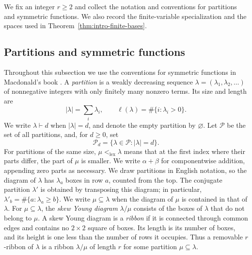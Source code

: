 \documentclass[12pt,reqno,a4paper]{amsart}
\numberwithin{equation}{section}
\numberwithin{figure}{section}
\theoremstyle{plain}
\theoremstyle{definition}
\begin{document}
We fix an integer $r\geq2$ and collect the notation and
conventions for partitions and symmetric functions.
We also record the finite-variable specialization and the spaces used
in Theorem~\ref{thm:intro-finite-bases}.

\subsection{Partitions and symmetric functions}
\label{subsec:ordinary-symmetric-functions}

Throughout this subsection we use the conventions for symmetric
functions in Macdonald's book \cite[Chapter~I]{Macdonald}.
A \emph{partition} is a weakly decreasing sequence
$\lambda=(\lambda_1,\lambda_2,\ldots)$ of nonnegative integers with
only finitely many nonzero terms.  Its size and length are
\[
 |\lambda|=\sum_i\lambda_i,
 \qquad
 \ell(\lambda)=\#\{i:\lambda_i>0\}.
\]
We write $\lambda\vdash d$ when $|\lambda|=d$, and denote the empty
partition by $\varnothing$.
Let $\mathscr P$ be the set of all partitions, and, for $d\geq0$, set
\[
 \mathscr P_d=\{\lambda\in\mathscr P:|\lambda|=d\}.
\]
For partitions of the same size, $\mu<_{\mathrm{lex}}\lambda$ means
that at the first index where their parts differ, the part of $\mu$
is smaller.  We write $\alpha+\beta$ for componentwise addition,
appending zero parts as necessary.
We draw partitions in English notation, so the diagram of $\lambda$
has $\lambda_a$ boxes in row $a$, counted from the top.  The conjugate
partition $\lambda'$ is obtained by transposing this diagram; in
particular, $\lambda'_b=\#\{a:\lambda_a\geq b\}$.  We write
$\mu\subseteq\lambda$ when the diagram of $\mu$ is contained in that
of $\lambda$.  For $\mu\subseteq\lambda$, the \emph{skew Young diagram}
$\lambda/\mu$ consists of the boxes of $\lambda$ that do not belong to
$\mu$.  A skew Young diagram is a \emph{ribbon} if it is connected
through common edges and contains no $2\times2$ square of boxes.  Its
length is its number of boxes, and its height is one less than the number
of rows it occupies.  Thus a removable $r$-ribbon of $\lambda$ is a
ribbon $\lambda/\mu$ of length $r$ for some partition
$\mu\subseteq\lambda$.
\end{document}
